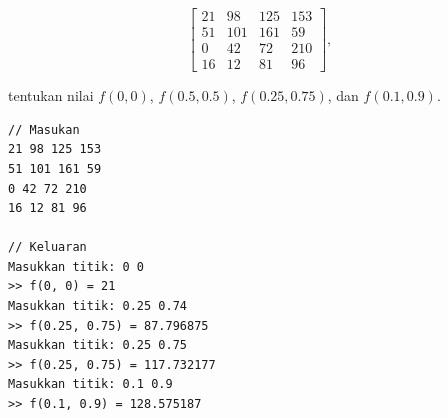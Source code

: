 \[
\begin{bmatrix}
    21 & 98 & 125 & 153 \\
    51 & 101 & 161 & 59 \\
    0 & 42 & 72 & 210 \\
    16 & 12 & 81 & 96
\end{bmatrix},
\]

tentukan nilai $f(0, 0)$, $f(0.5, 0.5)$, $f(0.25, 0.75)$, dan $f(0.1, 0.9)$.


\begin{lstlisting}[caption = interbicspl.txt]
// Masukan
21 98 125 153
51 101 161 59
0 42 72 210
16 12 81 96

// Keluaran
Masukkan titik: 0 0
>> f(0, 0) = 21
Masukkan titik: 0.25 0.74
>> f(0.25, 0.75) = 87.796875
Masukkan titik: 0.25 0.75
>> f(0.25, 0.75) = 117.732177
Masukkan titik: 0.1 0.9
>> f(0.1, 0.9) = 128.575187
\end{lstlisting}

\pagebreak

\pagebreak